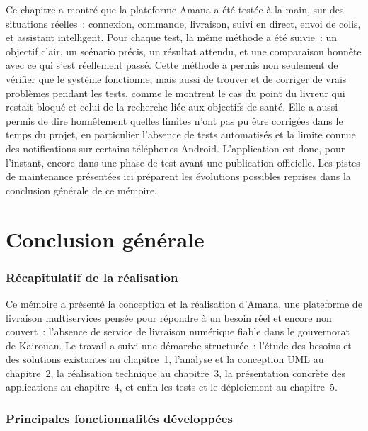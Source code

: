 \documentclass[12pt,fleqn,a4paper]{report}
\begin{document}
\begin{justify}
Ce chapitre a montré que la plateforme Amana a été testée à la main, sur des situations réelles~: connexion, commande, livraison, suivi en direct, envoi de colis, et assistant intelligent. Pour chaque test, la même méthode a été suivie~: un objectif clair, un scénario précis, un résultat attendu, et une comparaison honnête avec ce qui s'est réellement passé. Cette méthode a permis non seulement de vérifier que le système fonctionne, mais aussi de trouver et de corriger de vrais problèmes pendant les tests, comme le montrent le cas du point du livreur qui restait bloqué et celui de la recherche liée aux objectifs de santé. Elle a aussi permis de dire honnêtement quelles limites n'ont pas pu être corrigées dans le temps du projet, en particulier l'absence de tests automatisés et la limite connue des notifications sur certains téléphones Android. L'application est donc, pour l'instant, encore dans une phase de test avant une publication officielle. Les pistes de maintenance présentées ici préparent les évolutions possibles reprises dans la conclusion générale de ce mémoire.

\chapter*{Conclusion générale}

\subsection*{Récapitulatif de la réalisation}

Ce mémoire a présenté la conception et la réalisation d'Amana, une plateforme de livraison multiservices pensée pour répondre à un besoin réel et encore non couvert~: l'absence de service de livraison numérique fiable dans le gouvernorat de Kairouan. Le travail a suivi une démarche structurée~: l'étude des besoins et des solutions existantes au chapitre~1, l'analyse et la conception UML au chapitre~2, la réalisation technique au chapitre~3, la présentation concrète des applications au chapitre~4, et enfin les tests et le déploiement au chapitre~5.

\subsection*{Principales fonctionnalités développées}


\end{justify}
\end{document}
